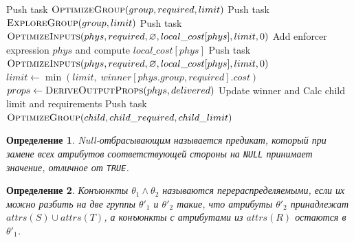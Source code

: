 \documentclass[14pt, russian]{scrartcl}
\newcounter{cDefinition}
\newtheorem{Definition}{Определение}[cDefinition]
\begin{document}
\begin{algorithm}[H]
    \caption{Алгоритм поиска (часть 2).}%
    \label{alg:cascades-search-2}
    \footnotesize
    \begin{algorithmic}[1]
            \State \Return
        \EndIf
            \State Push task $\Call{OptimizeGroup}{group, required, limit}$
            \State Push task $\Call{ExploreGroup}{group, limit}$
            \State \Return
        \EndIf
                \State Push task $\Call{OptimizeInputs}{phys, required, \varnothing, local\_cost[phys], limit, 0}$
            \EndIf
        \EndFor
            \State Add enforcer expression $phys$ and compute $local\_cost[phys]$
                \State Push task $\Call{OptimizeInputs}{phys, required, \varnothing, local\_cost[phys], limit, 0}$
            \EndIf
        \EndFor
            \State $limit \leftarrow \min(limit,\; winner[phys.group, required].cost)$
        \EndIf
            \State \Return
        \EndIf
            \State $props \leftarrow \Call{DeriveOutputProps}{phys, delivered}$
            \State Update winner and \Return
        \EndIf
        \State Calc child limit and requirements
        \State Push task $\Call{OptimizeGroup}{child, child\_required, child\_limit}$
    \EndProcedure
    \EndProcedure

    \end{algorithmic}
\end{algorithm}

\begin{Definition}
Null-отбрасывающим называется предикат, который при замене всех атрибутов
соответствующей стороны на \texttt{NULL} принимает значение, отличное от
\texttt{TRUE}.
\end{Definition}

\begin{Definition}
Конъюнкты \(\theta_1 \land \theta_2\) называются перераспределяемыми, если их
можно разбить на две группы \(\theta'_1\) и \(\theta'_2\) такие, что атрибуты
\(\theta'_2\) принадлежат \(attrs(S) \cup attrs(T)\), а конъюнкты с атрибутами
из \(attrs(R)\) остаются в \(\theta'_1\).
\end{Definition}
\end{document}
